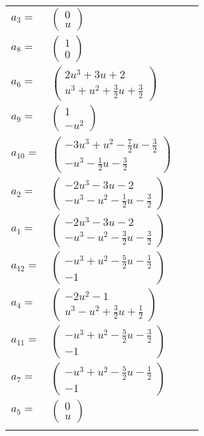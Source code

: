 \documentclass[1p]{elsarticle_modified}
\theoremstyle{definition}
\begin{document}
\begin{tabular}{m{7pt} m{180pt} m{7pt} m{180pt} }
\flushright $a_{3}=$&$\begin{pmatrix}0\\u\end{pmatrix}$ \\
\flushright $a_{8}=$&$\begin{pmatrix}1\\0\end{pmatrix}$ \\
\flushright $a_{6}=$&$\begin{pmatrix}2 u^3+3 u+2\\u^3+u^2+\frac{3}{2} u+\frac{3}{2}\end{pmatrix}$ \\
\flushright $a_{9}=$&$\begin{pmatrix}1\\- u^2\end{pmatrix}$ \\
\flushright $a_{10}=$&$\begin{pmatrix}-3 u^3+u^2-\frac{7}{2} u-\frac{3}{2}\\- u^3-\frac{1}{2} u-\frac{3}{2}\end{pmatrix}$ \\
\flushright $a_{2}=$&$\begin{pmatrix}-2 u^3-3 u-2\\- u^3- u^2-\frac{1}{2} u-\frac{3}{2}\end{pmatrix}$ \\
\flushright $a_{1}=$&$\begin{pmatrix}-2 u^3-3 u-2\\- u^3- u^2-\frac{3}{2} u-\frac{3}{2}\end{pmatrix}$ \\
\flushright $a_{12}=$&$\begin{pmatrix}- u^3+u^2-\frac{5}{2} u-\frac{1}{2}\\-1\end{pmatrix}$ \\
\flushright $a_{4}=$&$\begin{pmatrix}-2 u^2-1\\u^3- u^2+\frac{3}{2} u+\frac{1}{2}\end{pmatrix}$ \\
\flushright $a_{11}=$&$\begin{pmatrix}- u^3+u^2-\frac{5}{2} u-\frac{3}{2}\\-1\end{pmatrix}$ \\
\flushright $a_{7}=$&$\begin{pmatrix}- u^3+u^2-\frac{5}{2} u-\frac{1}{2}\\-1\end{pmatrix}$ \\
\flushright $a_{5}=$&$\begin{pmatrix}0\\u\end{pmatrix}$\\&\end{tabular}
\end{document}

